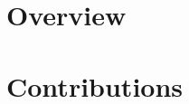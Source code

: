 \documentclass[english, openany, 11pt, twoside, headsepline, numbers=noenddot, chapterprefix=true, parskip=half-, final]{scrbook}
\begin{document}
	
	
\frontmatter 



\tableofcontents


\mainmatter

\pagestyle{scrheadings} 


\part{Overview}



\part{Contributions}






\appendix
\listoffigures
\listoftables




\backmatter
{\footnotesize  }

%
\end{document}
